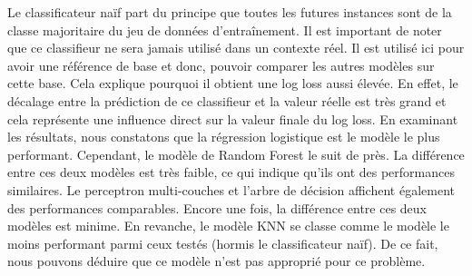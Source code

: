 \documentclass[12pt]{article}
\begin{document}
Le classificateur naïf part du principe que toutes les futures instances sont de la classe majoritaire du jeu de données d'entraînement. 
Il est important de noter que ce classifieur ne sera jamais utilisé dans un contexte réel.
Il est utilisé ici pour avoir une référence de base et donc, pouvoir comparer les autres modèles sur cette base.
Cela explique pourquoi il obtient une log loss aussi élevée.
En effet, le décalage entre la prédiction de ce classifieur et la valeur réelle est très grand et cela représente une influence direct sur la valeur finale du log loss.
\newline\newline 
En examinant les résultats, nous constatons que la régression logistique est le modèle le plus performant. 
Cependant, le modèle de Random Forest le suit de près. 
La différence entre ces deux modèles est très faible, ce qui indique qu'ils ont des performances similaires.
\newline\newline
Le perceptron multi-couches et l'arbre de décision affichent également des performances comparables. 
Encore une fois, la différence entre ces deux modèles est minime.
\newline\newline
En revanche, le modèle KNN se classe comme le modèle le moins performant parmi ceux testés (hormis le classificateur naïf). 
De ce fait, nous pouvons déduire que ce modèle n'est pas approprié pour ce problème.
\end{document}
